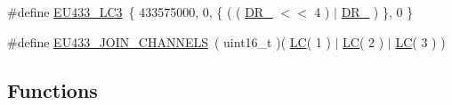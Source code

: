 \begin{DoxyCompactItemize}
\item 
\#define \hyperlink{group__REGIONEU433_ga4e6b881bf178cbd3cc8ab2716a24a231}{E\+U433\+\_\+\+L\+C3}~\{ 433575000, 0, \{ ( ( \hyperlink{group__REGION_ga872e12c82020c02a7f70a1c6ed1375df}{D\+R\+\_} $<$$<$ 4 ) $\vert$ \hyperlink{group__REGION_ga6c4ef966b4f3d5eb7597b087f2b97095}{D\+R\+\_} ) \}, 0 \}
\item 
\#define \hyperlink{group__REGIONEU433_ga68f08c679de44a903e7c2b0b57a31e00}{E\+U433\+\_\+\+J\+O\+I\+N\+\_\+\+C\+H\+A\+N\+N\+E\+LS}~( uint16\+\_\+t )( \hyperlink{group__REGION_ga12fa17e5c1016e01a9d82c25027deb1b}{LC}( 1 ) $\vert$ \hyperlink{group__REGION_ga12fa17e5c1016e01a9d82c25027deb1b}{LC}( 2 ) $\vert$ \hyperlink{group__REGION_ga12fa17e5c1016e01a9d82c25027deb1b}{LC}( 3 ) )
\end{DoxyCompactItemize}
\subsection*{Functions}
